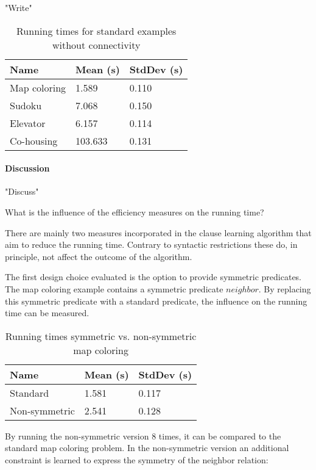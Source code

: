 \begin{experiment}
	"Write"

	\begin{table}[!htp]
		\begin{tabularx}{\textwidth}{XXX}
			\textbf{Name}	& \textbf{Mean (s)}	& \textbf{StdDev (s)} \\
			\toprule
			Map coloring 	& 1.589				& 0.110 \\
			Sudoku 			& 7.068				& 0.150 \\
			Elevator 		& 6.157 			& 0.114 \\
			Co-housing 		& 103.633			& 0.131
		\end{tabularx}
		\label{tbl:exp_speed_no_connect}
		\caption{Running times for standard examples without connectivity}
	\end{table}

\end{experiment}

\paragraph{Discussion}
"Discuss"

\begin{question}
	What is the influence of the efficiency measures on the running time?
\end{question}

There are mainly two measures incorporated in the clause learning algorithm that aim to reduce the running time.
Contrary to syntactic restrictions these do, in principle, not affect the outcome of the algorithm.

\begin{experiment}
	The first design choice evaluated is the option to provide symmetric predicates.
	The map coloring example contains a symmetric predicate $\mathit{neighbor}$.
	By replacing this symmetric predicate with a standard predicate, the influence on the running time can be measured.

	\begin{table}[!htp]
		\begin{tabularx}{\textwidth}{XXX}
			\textbf{Name}	& \textbf{Mean (s)}	& \textbf{StdDev (s)} \\
			\toprule
			Standard & 1.581 & 0.117 \\
			Non-symmetric & 2.541 & 0.128 \\
		\end{tabularx}
		\label{tbl:exp_speed_symm}
		\caption{Running times symmetric vs. non-symmetric map coloring}
	\end{table}

	By running the non-symmetric version $8$ times, it can be compared to the standard map coloring problem.
	In the non-symmetric version an additional constraint is learned to express the symmetry of the neighbor relation: 
\end{experiment}

